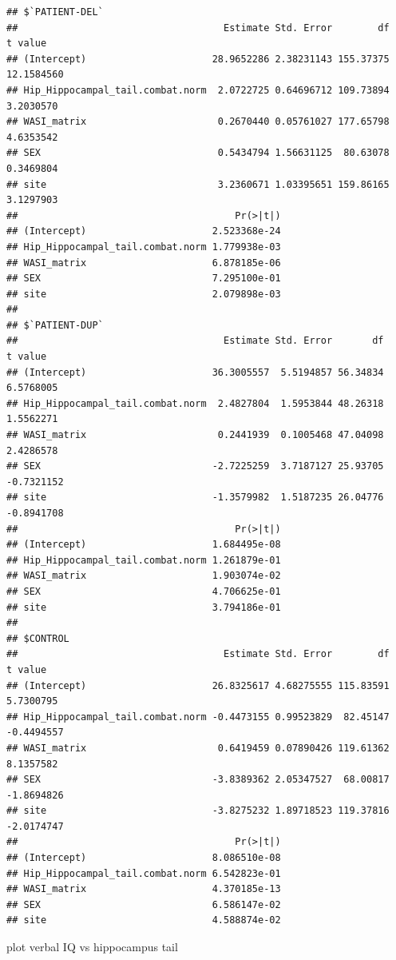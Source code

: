 \documentclass[
]{article}
\begin{document}
\begin{verbatim}
## $`PATIENT-DEL`
##                                    Estimate Std. Error        df    t value
## (Intercept)                      28.9652286 2.38231143 155.37375 12.1584560
## Hip_Hippocampal_tail.combat.norm  2.0722725 0.64696712 109.73894  3.2030570
## WASI_matrix                       0.2670440 0.05761027 177.65798  4.6353542
## SEX                               0.5434794 1.56631125  80.63078  0.3469804
## site                              3.2360671 1.03395651 159.86165  3.1297903
##                                      Pr(>|t|)
## (Intercept)                      2.523368e-24
## Hip_Hippocampal_tail.combat.norm 1.779938e-03
## WASI_matrix                      6.878185e-06
## SEX                              7.295100e-01
## site                             2.079898e-03
## 
## $`PATIENT-DUP`
##                                    Estimate Std. Error       df    t value
## (Intercept)                      36.3005557  5.5194857 56.34834  6.5768005
## Hip_Hippocampal_tail.combat.norm  2.4827804  1.5953844 48.26318  1.5562271
## WASI_matrix                       0.2441939  0.1005468 47.04098  2.4286578
## SEX                              -2.7225259  3.7187127 25.93705 -0.7321152
## site                             -1.3579982  1.5187235 26.04776 -0.8941708
##                                      Pr(>|t|)
## (Intercept)                      1.684495e-08
## Hip_Hippocampal_tail.combat.norm 1.261879e-01
## WASI_matrix                      1.903074e-02
## SEX                              4.706625e-01
## site                             3.794186e-01
## 
## $CONTROL
##                                    Estimate Std. Error        df    t value
## (Intercept)                      26.8325617 4.68275555 115.83591  5.7300795
## Hip_Hippocampal_tail.combat.norm -0.4473155 0.99523829  82.45147 -0.4494557
## WASI_matrix                       0.6419459 0.07890426 119.61362  8.1357582
## SEX                              -3.8389362 2.05347527  68.00817 -1.8694826
## site                             -3.8275232 1.89718523 119.37816 -2.0174747
##                                      Pr(>|t|)
## (Intercept)                      8.086510e-08
## Hip_Hippocampal_tail.combat.norm 6.542823e-01
## WASI_matrix                      4.370185e-13
## SEX                              6.586147e-02
## site                             4.588874e-02
\end{verbatim}

plot verbal IQ vs hippocampus tail
\end{document}
